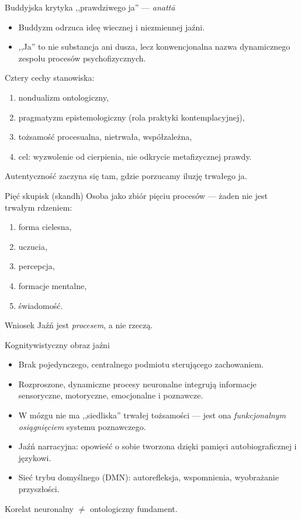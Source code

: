 \documentclass{beamer}
\begin{document}
\begin{frame}{Buddyjska krytyka ,,prawdziwego ja'' --- \emph{anattā}}
  \begin{itemize}
    \item Buddyzm odrzuca ideę wiecznej i niezmiennej jaźni.
    \item ,,Ja'' to nie substancja ani dusza, lecz konwencjonalna nazwa
          dynamicznego zespołu procesów psychofizycznych.
  \end{itemize}
  \vspace{0.5em}
  Cztery cechy stanowiska:
  \begin{enumerate}
    \item nondualizm ontologiczny,
    \item pragmatyzm epistemologiczny (rola praktyki kontemplacyjnej),
    \item tożsamość procesualna, nietrwała, współzależna,
    \item cel: wyzwolenie od cierpienia, nie odkrycie metafizycznej prawdy.
  \end{enumerate}
  \vspace{0.3em}
  Autentyczność zaczyna się tam, gdzie porzucamy iluzję trwałego ja.
\end{frame}
 
\begin{frame}{Pięć skupisk (skandh)}
  Osoba jako zbiór pięciu procesów --- żaden nie jest trwałym rdzeniem:
  \begin{enumerate}
    \item forma cielesna,
    \item uczucia,
    \item percepcja,
    \item formacje mentalne,
    \item świadomość.
  \end{enumerate}
  \vspace{0.5em}
  \begin{block}{Wniosek}
    Jaźń jest \emph{procesem}, a nie rzeczą.
  \end{block}
\end{frame}
 
\begin{frame}{Kognitywistyczny obraz jaźni}
  \begin{itemize}
    \item Brak pojedynczego, centralnego podmiotu sterującego zachowaniem.
    \item Rozproszone, dynamiczne procesy neuronalne integrują informacje
          sensoryczne, motoryczne, emocjonalne i poznawcze.
    \item W mózgu nie ma ,,siedliska'' trwałej tożsamości --- jest ona
          \emph{funkcjonalnym osiągnięciem} systemu poznawczego.
    \item Jaźń narracyjna: opowieść o sobie tworzona dzięki pamięci
          autobiograficznej i językowi.
    \item Sieć trybu domyślnego (DMN): autorefleksja, wspomnienia,
          wyobrażanie przyszłości.
  \end{itemize}
  \vspace{0.3em}
  \footnotesize Korelat neuronalny \(\neq\) ontologiczny fundament.
\end{frame}
 
\end{document}
